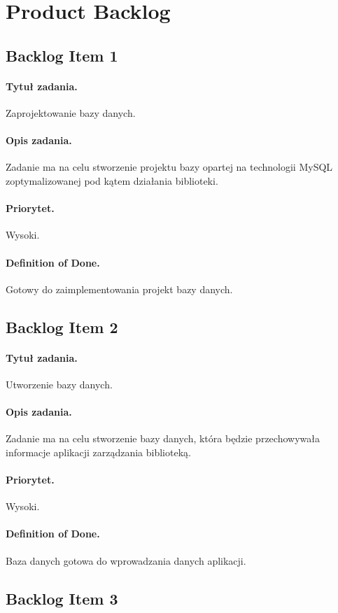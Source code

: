 \documentclass[a4paper]{article}
\begin{document}
\section{Product Backlog}

\subsection{Backlog Item 1}
\paragraph{Tytuł zadania.} Zaprojektowanie bazy danych.
\paragraph{Opis zadania.} Zadanie ma na celu stworzenie projektu bazy opartej na technologii MySQL zoptymalizowanej pod kątem działania biblioteki.
\paragraph{Priorytet.} Wysoki.
\paragraph{Definition of Done.} Gotowy do zaimplementowania projekt bazy danych.

\subsection{Backlog Item 2}
\paragraph{Tytuł zadania.} Utworzenie bazy danych.
\paragraph{Opis zadania.} Zadanie ma na celu stworzenie bazy danych, która będzie przechowywała informacje aplikacji zarządzania biblioteką.
\paragraph{Priorytet.} Wysoki.
\paragraph{Definition of Done.} Baza danych gotowa do wprowadzania danych aplikacji.


\subsection{Backlog Item 3}
\end{document}
